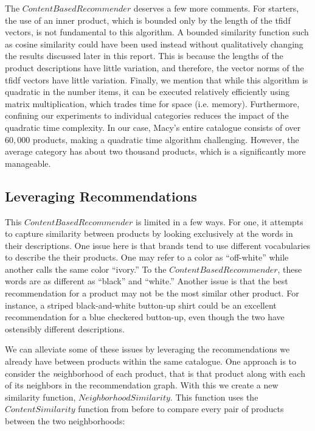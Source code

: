 \documentclass[11pt]{article}
\begin{document}
The $ContentBasedRecommender$ deserves a few more comments. For starters, the
use of an inner product, which is bounded only by the length of the tfidf
vectors, is not fundamental to this algorithm. A bounded similarity function
such as cosine similarity could have been used instead without qualitatively
changing the results discussed later in this report. This is because the lengths
of the product descriptions have little variation, and therefore, the vector
norms of the tfidf vectors have little variation. Finally, we mention that while
this algorithm is quadratic in the number items, it can be executed relatively
efficiently using matrix multiplication, which trades time for space (i.e.
memory). Furthermore, confining our experiments to individual categories reduces
the impact of the quadratic time complexity. In our case, Macy's entire
catalogue consists of over $60,000$ products, making a quadratic time algorithm
challenging. However, the average category has about two thousand products,
which is a significantly more manageable.

\subsection*{Leveraging Recommendations}
This $ContentBased Recommender$ is limited in a few ways. For one, it attempts
to capture similarity between products by looking exclusively at the words in
their descriptions. One issue here is that brands tend to use different 
vocabularies to describe the their products. One may refer to a color as 
``off-white'' while another calls the same color ``ivory.'' To the $ContentBased
Recommender$, these words are as different as ``black'' and ``white.'' Another 
issue is that the best recommendation for a product may not be the most similar
other product. For instance, a striped black-and-white button-up shirt could be 
an excellent recommendation for a blue checkered button-up, even though the two 
have ostensibly different descriptions.

We can alleviate some of these issues by leveraging the recommendations we
already have between products within the same catalogue. One approach is to 
consider the {\emph neighborhood} of each product, that is that product along 
with each of its neighbors in the recommendation graph. With this we create a
new similarity function, $NeighborhoodSimilarity$. This function uses the 
$ContentSimilarity$ function from before to compare every pair of products 
between the two neighborhoods:
\end{document}
